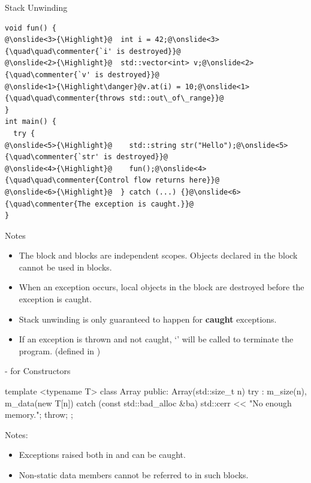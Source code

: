 \documentclass{beamer}
\newcommand{\Highlight}{\makebox[0pt][l]{\color{pink}\rule[-4pt]{\textwidth}{11pt}}}
\begin{document}
\begin{frame}[fragile]{Stack Unwinding}
  \begin{lstlisting}[language = {[11]C++}, escapechar = \@]
void fun() {
@\onslide<3>{\Highlight}@  int i = 42;@\onslide<3>{\quad\quad\commenter{`i' is destroyed}}@
@\onslide<2>{\Highlight}@  std::vector<int> v;@\onslide<2>{\quad\commenter{`v' is destroyed}}@
@\onslide<1>{\Highlight\danger}@v.at(i) = 10;@\onslide<1>{\quad\quad\commenter{throws std::out\_of\_range}}@
}
int main() {
  try {
@\onslide<5>{\Highlight}@    std::string str("Hello");@\onslide<5>{\quad\commenter{`str' is destroyed}}@
@\onslide<4>{\Highlight}@    fun();@\onslide<4>{\quad\quad\commenter{Control flow returns here}}@
@\onslide<6>{\Highlight}@  } catch (...) {}@\onslide<6>{\quad\commenter{The exception is caught.}}@
}
  \end{lstlisting}
\end{frame}

\begin{frame}[fragile]{Notes}
  \begin{itemize}
    \item The  block and  blocks are independent scopes. Objects declared in the  block cannot be used in  blocks.
    \item When an exception occurs, local objects in the  block are destroyed before the exception is caught.
    \item Stack unwinding is only guaranteed to happen for \textbf{caught} exceptions.
    \item If an exception is thrown and not caught, `' will be called to terminate the program. (defined in )
  \end{itemize}
\end{frame}

\begin{frame}[fragile]{- for Constructors}
  \begin{cpp}
template <typename T>
class Array {
 public:
  Array(std::size_t n)
      try : m_size(n), m_data(new T[n]{}) {}
  catch (const std::bad_alloc &ba) {
    std::cerr << "No enough memory.\n";
    throw;
  }
};
  \end{cpp}
  Notes:
  \begin{itemize}
    \item Exceptions raised both in  and  can be caught.
    \item Non-static data members cannot be referred to in such  blocks. 
  \end{itemize}
\end{frame}
\end{document}
